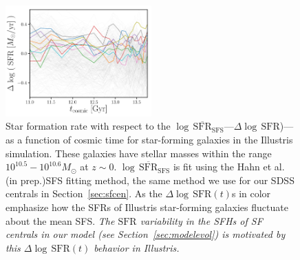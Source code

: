 \documentclass[12pt, letterpaper, preprint, tighten]{aastex}
\newcommand{\logsfr}{\log \, \mathrm{SFR}}
\newcommand{\musfms}{\log\,\overline{\mathrm{SFR}}_\mathrm{SFS}}
\newcommand{\hahngmm}{Hahn et al. (in prep.)}
\begin{document}
\begin{figure}
\begin{center}
\includegraphics[width=0.5\textwidth]{figs/illustris_sfh.pdf} 
    \caption{Star formation rate with respect to the $\musfms$---$\Delta \logsfr$)---as 
    a function of cosmic time for star-forming galaxies in the Illustris simulation. 
    These galaxies have stellar masses within the range $10^{10.5}-10^{10.6}M_\odot$ 
    at $z\sim0$. $\musfms$ is fit using the \hahngmm SFS fitting method, the same method
    we use for our SDSS centrals in Section~\ref{sec:sfcen}. As the $\Delta \logsfr(t)$s
    in color emphasize how the SFRs of Illustris star-forming galaxies fluctuate about 
    the mean SFS. \emph{The $\mathrm{SFR}$ variability in the SFHs of SF centrals in our model (see 
    Section~\ref{sec:modelevol}) is motivated by this $\Delta \logsfr(t)$ behavior in 
    Illustris.}}
\label{fig:illsfh}
\end{center}
\end{figure}
\end{document}
